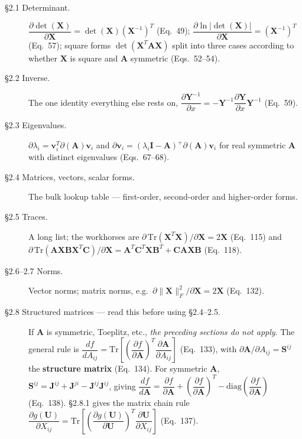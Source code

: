 \documentclass[10pt,a4paper]{article}
\begin{document}
\begin{description}
\item[\S2.1 Determinant.]
      $\dfrac{\partial\det(\mathbf{X})}{\partial\mathbf{X}}=\det(\mathbf{X})(\mathbf{X}^{-1})^{T}$
      (Eq.~49); $\dfrac{\partial\ln\lvert\det(\mathbf{X})\rvert}{\partial\mathbf{X}}=(\mathbf{X}^{-1})^{T}$
      (Eq.~57); square forms $\det(\mathbf{X}^{T}\mathbf{A}\mathbf{X})$ split into
      three cases according to whether $\mathbf{X}$ is square and $\mathbf{A}$
      symmetric (Eqs.~52--54).
\item[\S2.2 Inverse.]  The one identity everything else rests on,
      $\dfrac{\partial\mathbf{Y}^{-1}}{\partial x}=-\mathbf{Y}^{-1}\dfrac{\partial\mathbf{Y}}{\partial x}\mathbf{Y}^{-1}$
      (Eq.~59).
\item[\S2.3 Eigenvalues.]  $\partial\lambda_{i}=\mathbf{v}_{i}^{T}\partial(\mathbf{A})\mathbf{v}_{i}$
      and $\partial\mathbf{v}_{i}=(\lambda_{i}\mathbf{I}-\mathbf{A})^{+}\partial(\mathbf{A})\mathbf{v}_{i}$
      for real symmetric $\mathbf{A}$ with distinct eigenvalues (Eqs.~67--68).
\item[\S2.4 Matrices, vectors, scalar forms.]  The bulk lookup table --- first-order,
      second-order and higher-order forms.
\item[\S2.5 Traces.]  A long list; the workhorses are
      $\partial\,\mathrm{Tr}(\mathbf{X}^{T}\mathbf{X})/\partial\mathbf{X}=2\mathbf{X}$
      (Eq.~115) and
      $\partial\,\mathrm{Tr}(\mathbf{AXBX}^{T}\mathbf{C})/\partial\mathbf{X}=\mathbf{A}^{T}\mathbf{C}^{T}\mathbf{X}\mathbf{B}^{T}+\mathbf{CAXB}$
      (Eq.~118).
\item[\S2.6--2.7 Norms.]  Vector norms; matrix norms, e.g.\
      $\partial\lVert\mathbf{X}\rVert_{F}^{2}/\partial\mathbf{X}=2\mathbf{X}$ (Eq.~132).
\item[\S2.8 Structured matrices --- read this before using \S2.4--2.5.]
      If $\mathbf{A}$ is symmetric, Toeplitz, etc., \emph{the preceding sections do
      not apply}.  The general rule is
      $\dfrac{df}{dA_{ij}}=\mathrm{Tr}\!\left[\left(\dfrac{\partial f}{\partial\mathbf{A}}\right)^{T}\dfrac{\partial\mathbf{A}}{\partial A_{ij}}\right]$
      (Eq.~133), with $\partial\mathbf{A}/\partial A_{ij}=\mathbf{S}^{ij}$ the
      \textbf{structure matrix} (Eq.~134).  For symmetric $\mathbf{A}$,
      $\mathbf{S}^{ij}=\mathbf{J}^{ij}+\mathbf{J}^{ji}-\mathbf{J}^{ij}\mathbf{J}^{ij}$,
      giving
      $\dfrac{df}{d\mathbf{A}}=\dfrac{\partial f}{\partial\mathbf{A}}+\left(\dfrac{\partial f}{\partial\mathbf{A}}\right)^{T}-\mathrm{diag}\!\left(\dfrac{\partial f}{\partial\mathbf{A}}\right)$
      (Eq.~138).  \S2.8.1 gives the matrix chain rule
      $\dfrac{\partial g(\mathbf{U})}{\partial X_{ij}}=\mathrm{Tr}\!\left[\left(\dfrac{\partial g(\mathbf{U})}{\partial\mathbf{U}}\right)^{T}\dfrac{\partial\mathbf{U}}{\partial X_{ij}}\right]$
      (Eq.~137).
\end{description}
\end{document}
